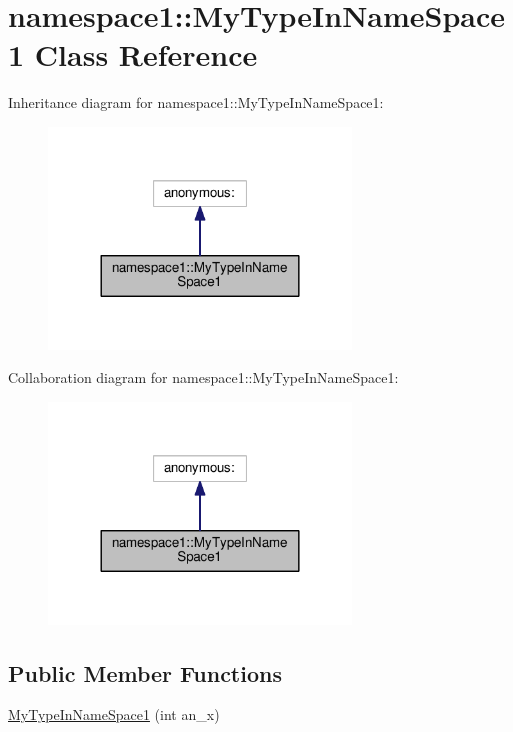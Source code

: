 \hypertarget{classnamespace1_1_1MyTypeInNameSpace1}{}\section{namespace1\+:\+:My\+Type\+In\+Name\+Space1 Class Reference}
\label{classnamespace1_1_1MyTypeInNameSpace1}


Inheritance diagram for namespace1\+:\+:My\+Type\+In\+Name\+Space1\+:
\nopagebreak
\begin{figure}[H]
\begin{center}
\leavevmode
\includegraphics[width=228pt]{classnamespace1_1_1MyTypeInNameSpace1__inherit__graph}
\end{center}
\end{figure}


Collaboration diagram for namespace1\+:\+:My\+Type\+In\+Name\+Space1\+:
\nopagebreak
\begin{figure}[H]
\begin{center}
\leavevmode
\includegraphics[width=228pt]{classnamespace1_1_1MyTypeInNameSpace1__coll__graph}
\end{center}
\end{figure}
\subsection*{Public Member Functions}
\begin{DoxyCompactItemize}
\item 
\hyperlink{classnamespace1_1_1MyTypeInNameSpace1_a2e4277aa118e9b83045a18392188a0d8}{My\+Type\+In\+Name\+Space1} (int an\+\_\+x)
\end{DoxyCompactItemize}


